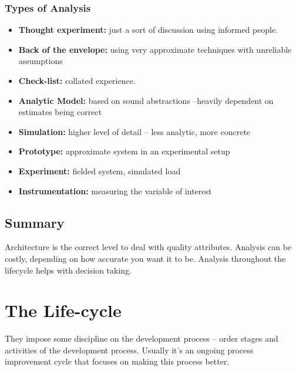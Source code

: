 \documentclass[a4paper]{article}
\begin{document}
\subsubsection{Types of Analysis}
\begin{itemize}
\item
\textbf{Thought experiment:} just a sort of discussion using informed people. 

\item
\textbf{Back of the envelope:} using very approximate techniques with unreliable assumptions

\item
\textbf{Check-list:} collated experience.

\item
\textbf{Analytic Model:} based on sound abstractions –heavily dependent on estimates being correct

\item
\textbf{Simulation:} higher level of detail – less analytic, more concrete 

\item
\textbf{Prototype:} approximate system in an experimental setup

\item
\textbf{Experiment:} fielded system, simulated load 

\item
\textbf{Instrumentation:} measuring the variable of interest
\end{itemize}

\subsection{Summary}
Architecture is the correct level to deal with quality attributes.
Analysis can be costly, depending on how accurate you want it to be.
Analysis throughout the lifecycle helps with decision taking.

\newpage
\section{The Life-cycle}
They impose some discipline on the development process – order stages and activities of the development process. Usually it's an ongoing process improvement cycle that focuses on making this process better.
\end{document}
